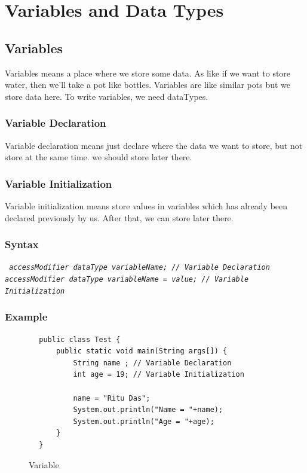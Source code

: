 \documentclass[openany]{book}  %
\begin{document}
\chapter{Variables and Data Types}
% 
% 
\section{Variables}
Variables means a place where we store some data.
As like if we want to store water, then we'll take a pot like bottles.
Variables are like similar pots but we store data here. To write variables, we need dataTypes.
% 
%
\subsection{Variable Declaration}
Variable declaration means just declare where the data we want to store, but not store at the same time. we should store later there.
% 
%
\subsection{Variable Initialization}
Variable initialization means store values in variables which has already been declared previously by us. After that, we can store later there.
% 
%
\subsection{Syntax}
\begin{center}
    \tt{
        \textit{accessModifier dataType variableName; // Variable Declaration}\\
        \null\textit{accessModifier dataType variableName = value; // Variable Initialization}
    }
\end{center}
% 
%
\subsection{Example}
\begin{center}
    \begin{verbatim}
        public class Test {
            public static void main(String args[]) {
                String name ; // Variable Declaration
                int age = 19; // Variable Initialization

                name = "Ritu Das";
                System.out.println("Name = "+name);
                System.out.println("Age = "+age);
            }
        }
    \end{verbatim}
\end{center}
% 
% 
\begin{figure}[htbp]
    \begin{center}
        \quad\quad{}
        \caption{Variable\cite{Ref3}}
    \end{center}
\end{figure}
% 
%
\end{document}
